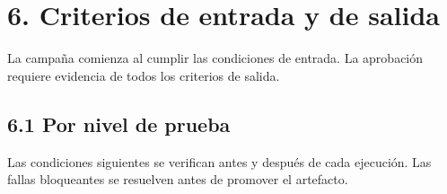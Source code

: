 \section*{6. Criterios de entrada y de salida}

La campaña comienza al cumplir las condiciones de entrada. La aprobación requiere evidencia de todos los criterios de salida.

\subsection*{6.1 Por nivel de prueba}

Las condiciones siguientes se verifican antes y después de cada ejecución. Las fallas bloqueantes se resuelven antes de promover el artefacto.

